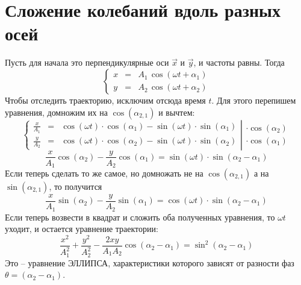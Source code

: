 \section{Сложение колебаний вдоль разных осей}

Пусть для начала это перпендикулярные оси $\vec{x}$ и $\vec{y}$, и частоты равны. Тогда
\begin{displaymath}
\left\{
\begin{array}{lcr}
x&=&A_1\,\cos(\omega t+\alpha_1)\\
y&=&A_2\,\cos(\omega t+\alpha_2)
\end{array}
\right.
\end{displaymath}
Чтобы отследить траекторию, исключим отсюда время $t$. Для этого пе\-ре\-пи\-шем уравнения, домножим их на $\cos(\alpha_{2,1})$ и вычтем:
\begin{displaymath}
\left\{
\begin{array}{lcr}
\frac{x}{A_1}&=&\cos(\omega t)\cdot\cos(\alpha_1)-\sin(\omega t)\cdot\sin(\alpha_1) \\
\frac{y}{A_2}&=&\cos(\omega t)\cdot\cos(\alpha_2)-\sin(\omega t)\cdot\sin(\alpha_2)
\end{array}
\right|
\begin{array}{l}
\cdot\cos(\alpha_2)\\
\cdot\cos(\alpha_1)
\end{array}
\end{displaymath}
\begin{displaymath}
\frac{x}{A_1}\cos(\alpha_2)-\frac{y}{A_2}\cos(\alpha_1)=
\sin(\omega t)\cdot\sin(\alpha_2-\alpha_1)
\end{displaymath}
Если теперь сделать то же самое, но домножать не на $\cos(\alpha_{2,1})$ а на $\sin(\alpha_{2,1})$, то получится
\begin{displaymath}
\frac{x}{A_1}\sin(\alpha_2)-\frac{y}{A_2}\sin(\alpha_1)=
\cos(\omega t)\cdot\sin(\alpha_2-\alpha_1)
\end{displaymath}
Если теперь возвести в квадрат и сложить оба полученных уравнения, то
 $\omega t$ уходит, и остается уравнение траектории:
\begin{displaymath}
\frac{x^2}{A_1^2}+\frac{y^2}{A_2^2}-\frac{2xy}{A_1A_2}\cos(\alpha_2-\alpha_1)=
\sin^2(\alpha_2-\alpha_1)
\end{displaymath}
Это -- уравнение ЭЛЛИПСА, характеристики которого зависят от разности фаз $\theta=(\alpha_2-\alpha_1)$.
